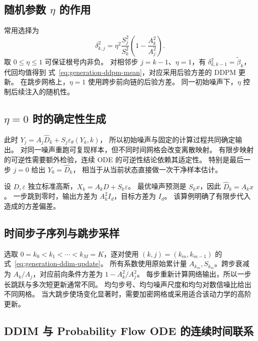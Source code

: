\subsection{随机参数 \texorpdfstring{\(\eta\)}{η} 的作用}

常用选择为
\begin{equation}
 \delta_{k,j}^2=\eta^2\frac{S_j^2}{S_k^2}
                         \left(1-\frac{A_k^2}{A_j^2}\right).
 \label{eq:generation-ddim-eta}
\end{equation}
取 \(0\le\eta\le1\) 可保证根号内非负。
对相邻步 \(j=k-1\)、\(\eta=1\)，有
\(\delta_{k,k-1}^2=\widetilde\beta_k\)，代回均值得到
式~\eqref{eq:generation-ddpm-mean}，对应采用后验方差的 DDPM 更新。
在跳步网格上，\(\eta=1\) 使用跨步前向链的后验方差。
同一初始噪声下，\(\eta\) 控制后续注入的随机性。

\subsection{\texorpdfstring{\(\eta=0\)}{η=0} 时的确定性生成}

此时 \(Y_j=A_j\widehat D_k+S_j\varepsilon_\theta(Y_k,k)\)，
所以初始噪声与固定的计算过程共同确定输出。
对同一噪声重跑可复现样本，但不同时间网格会改变离散映射。
有限步映射的可逆性需要额外检验，连续 ODE 的可逆性结论依赖其适定性。
特别是最后一步 \(j=0\) 给出 \(Y_0=\widehat D_k\)，
相当于从当前状态直接做一次干净样本估计。

\begin{example}
设 \(D,\varepsilon\) 独立标准高斯，\(X_k=A_kD+S_k\varepsilon\)。
最优噪声预测是 \(S_kx\)，因此 \(\widehat D_k=A_kx\)。
一步跳到零时，输出方差为 \(A_k^2I_d\)，目标方差为 \(I_d\)。
该算例明确了有限步代入造成的方差偏差。
\end{example}

\subsection{时间步子序列与跳步采样}

选取 \(0=k_0<k_1<\cdots<k_M=K\)，逐对使用
\((k,j)=(k_m,k_{m-1})\) 的式~\eqref{eq:generation-ddim-update}。
所有系数使用原始累计量 \(A_{k_m},S_{k_m}\)。跨步衰减为
\(A_k/A_j\)，对应前向条件方差为 \(1-A_k^2/A_j^2\)。
每步重新计算网络输出，所以一步长跳跃与多次短更新通常不同。
均匀步号、均匀噪声尺度和均匀对数信噪比给出不同网格。
当大跳步使场变化显著时，需要加密网格或采用适合该动力学的高阶更新。

\subsection{DDIM 与 Probability Flow ODE 的连续时间联系}

